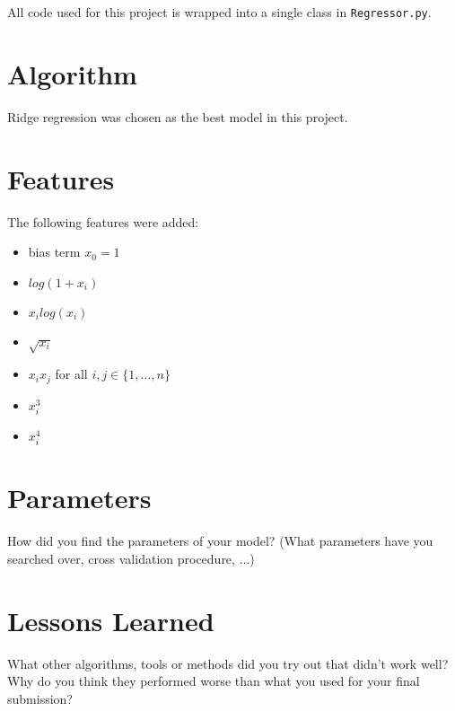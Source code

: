 \documentclass[a4paper, 11pt]{article}
\begin{document}
All code used for this project is wrapped into a single class in \verb+Regressor.py+.

\section{Algorithm}
Ridge regression was chosen as the best model in this project.

\section{Features}
The following features were added:
\label{sec:features}
\begin{itemize}
		\item bias term $x_0=1$
		\item $log(1 + x_i)$
		\item $x_i log(x_i)$
		\item $\sqrt{x_i}$
		\item $x_i x_j$ for all $i,j \in \{1,...,n\}$
		\item $x_i^3$
		\item $x_i^4$
	\end{itemize}

\section{Parameters}
How did you find the parameters of your model? (What parameters have you searched over, cross validation procedure, $\ldots$)

\section{Lessons Learned}



What other algorithms, tools or methods did you try out that didn't work well?
Why do you think they performed worse than what you used for your final submission?
\end{document}
